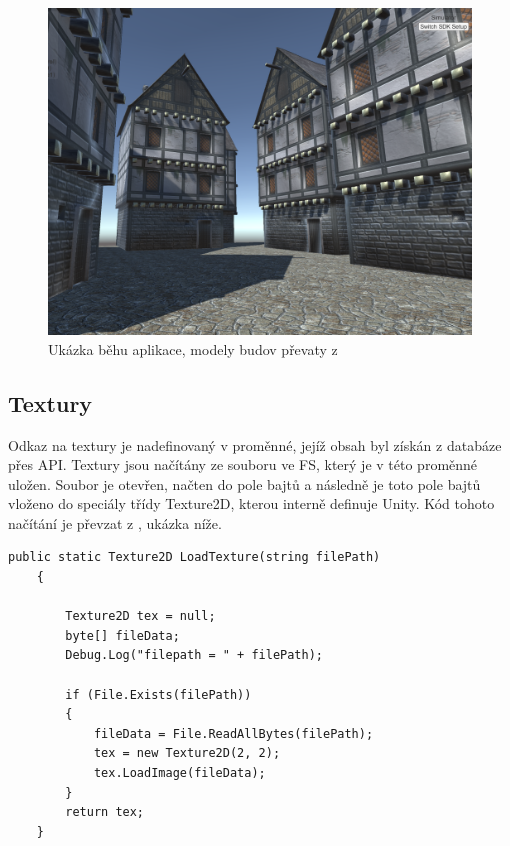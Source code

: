 \documentclass[thesis=B,czech]{FITthesis}[2012/06/26]
\begin{document}
    

\begin{figure}
  		\includegraphics[width=\textwidth,height=\textheight,keepaspectratio]{screen1.png}
  		\caption{Ukázka běhu aplikace, modely budov převaty z \cite{building}}
  		\label{fig:buildings}
	\end{figure}
    
    
    \subsection{Textury}
    
    Odkaz na textury je nadefinovaný v proměnné, jejíž obsah byl získán z databáze přes API. Textury jsou načítány ze souboru ve FS, který je v této proměnné uložen. Soubor je otevřen, načten do pole bajtů a následně je toto pole bajtů vloženo do speciály třídy Texture2D, kterou interně definuje Unity. Kód tohoto načítání je převzat z \cite{unityFAQtext}, ukázka níže.

\begin{lstlisting}[frame=single]
  public static Texture2D LoadTexture(string filePath)
    {

        Texture2D tex = null;
        byte[] fileData;
        Debug.Log("filepath = " + filePath);

        if (File.Exists(filePath))
        {
            fileData = File.ReadAllBytes(filePath);
            tex = new Texture2D(2, 2);
            tex.LoadImage(fileData);
        }
        return tex;
    }
        \end{lstlisting}	
        
\end{document}
